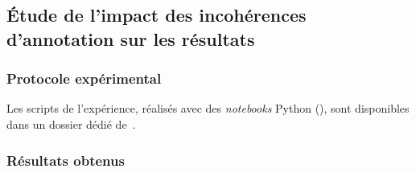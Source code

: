 	
	
	\subsection{Étude de l'impact des incohérences d'annotation sur les résultats}
	\label{section:4.6.2-ETUDE-ROBUSTESSE-SIMULATION-IMPACT-DIFFERENCES}
		
	
		\subsubsection{Protocole expérimental}
			
			
			\begin{leftBarInformation}
				Les scripts de l'expérience, réalisés avec des \textit{notebooks} Python (\cite{van-rossum-drake:2009:python-reference-manual}), sont disponibles dans un dossier dédié de~\cite{schild:2021:cognitivefactory-interactiveclusteringcomparativestudy}.
			\end{leftBarInformation}

		\subsubsection{Résultats obtenus}
			

